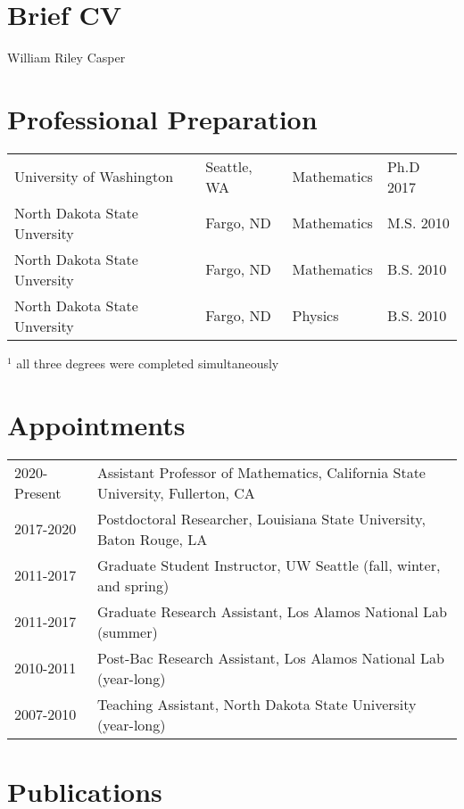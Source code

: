 \documentclass[11pt,letterpaper]{article}
\newcommand{\required}[1]{\section*{\hfil #1\hfil}}                    %
\theoremstyle{definition}
\begin{document}
\required{Brief CV}
\begin{center}
William Riley Casper
\end{center}

\section{Professional Preparation}
\begin{tabular}{llll}
University of Washington\hspace{2in}&Seattle, WA\hspace{2in}&Mathematics\hspace{2in}&Ph.D 2017\\
North Dakota State Unversity&Fargo, ND&Mathematics&M.S. 2010\footnotemark\\
North Dakota State Unversity&Fargo, ND&Mathematics&B.S. 2010\\
North Dakota State Unversity&Fargo, ND&Physics&B.S. 2010\\
\end{tabular}

{$^1$ \footnotesize all three degrees were completed simultaneously}
\section{Appointments}
\begin{tabular}{ll}
2020-Present & Assistant Professor of Mathematics, California State University, Fullerton, CA\\
2017-2020 & Postdoctoral Researcher, Louisiana State University, Baton Rouge, LA\\
2011-2017 & Graduate Student Instructor, UW Seattle (fall, winter, and spring)\\
2011-2017 & Graduate Research Assistant, Los Alamos National Lab (summer)\\
2010-2011 & Post-Bac Research Assistant, Los Alamos National Lab (year-long)\\
2007-2010 & Teaching Assistant, North Dakota State University (year-long)\\
\end{tabular}
\section{Publications}
\end{document}
